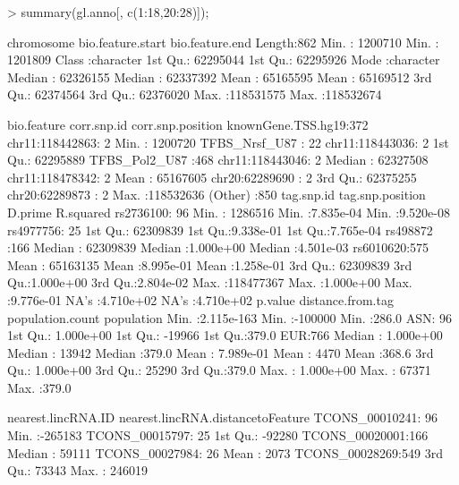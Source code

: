 \documentclass[12pt,fullpage]{article}
\begin{document}
\begin{Schunk}
\begin{Sinput}
> summary(gl.anno[, c(1:18,20:28)]);
\end{Sinput}
\begin{Soutput}
  chromosome        bio.feature.start   bio.feature.end    
 Length:862         Min.   :  1200710   Min.   :  1201809  
 Class :character   1st Qu.: 62295044   1st Qu.: 62295926  
 Mode  :character   Median : 62326155   Median : 62337392  
                    Mean   : 65165595   Mean   : 65169512  
                    3rd Qu.: 62374564   3rd Qu.: 62376020  
                    Max.   :118531575   Max.   :118532674  
                                                           
             bio.feature           corr.snp.id  corr.snp.position  
 knownGene.TSS.hg19:372   chr11:118442863:  2   Min.   :  1200720  
 TFBS_Nrsf_U87     : 22   chr11:118443036:  2   1st Qu.: 62295889  
 TFBS_Pol2_U87     :468   chr11:118443046:  2   Median : 62327508  
                          chr11:118478342:  2   Mean   : 65167605  
                          chr20:62289690 :  2   3rd Qu.: 62375255  
                          chr20:62289873 :  2   Max.   :118532636  
                          (Other)        :850                      
     tag.snp.id  tag.snp.position       D.prime            R.squared        
 rs2736100: 96   Min.   :  1286516   Min.   :7.835e-04   Min.   :9.520e-08  
 rs4977756: 25   1st Qu.: 62309839   1st Qu.:9.338e-01   1st Qu.:7.765e-04  
 rs498872 :166   Median : 62309839   Median :1.000e+00   Median :4.501e-03  
 rs6010620:575   Mean   : 65163135   Mean   :8.995e-01   Mean   :1.258e-01  
                 3rd Qu.: 62309839   3rd Qu.:1.000e+00   3rd Qu.:2.804e-02  
                 Max.   :118477367   Max.   :1.000e+00   Max.   :9.776e-01  
                                     NA's   :4.710e+02   NA's   :4.710e+02  
    p.value           distance.from.tag population.count population
 Min.   :2.115e-163   Min.   :-100000   Min.   :286.0    ASN: 96   
 1st Qu.: 1.000e+00   1st Qu.: -19966   1st Qu.:379.0    EUR:766   
 Median : 1.000e+00   Median :  13942   Median :379.0              
 Mean   : 7.989e-01   Mean   :   4470   Mean   :368.6              
 3rd Qu.: 1.000e+00   3rd Qu.:  25290   3rd Qu.:379.0              
 Max.   : 1.000e+00   Max.   :  67371   Max.   :379.0              
                                                                   
      nearest.lincRNA.ID nearest.lincRNA.distancetoFeature
 TCONS_00010241: 96      Min.   :-265183                  
 TCONS_00015797: 25      1st Qu.: -92280                  
 TCONS_00020001:166      Median :  59111                  
 TCONS_00027984: 26      Mean   :   2073                  
 TCONS_00028269:549      3rd Qu.:  73343                  
                         Max.   : 246019                  
                                                          

\end{Soutput}
\end{Schunk}
\end{document}
